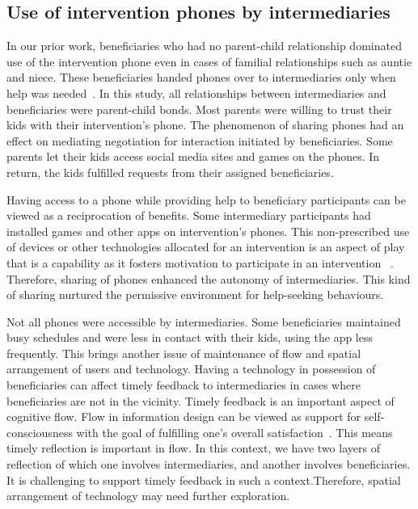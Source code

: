 \documentclass{sig-alternate}
\begin{document}
\subsection*{\textbf{Use of intervention phones by intermediaries}}
In our prior work, beneficiaries who had no parent-child relationship dominated use of the intervention phone even in cases of familial relationships such as auntie and niece. These beneficiaries handed phones over to intermediaries only when help was needed~\cite{katule2016:leveraging}. In this study, all relationships between intermediaries and beneficiaries were parent-child bonds. Most parents were willing to trust their kids with their intervention's phone. The phenomenon of sharing phones had an effect on mediating negotiation for interaction initiated by beneficiaries. Some parents let their kids access social media sites and games on the phones. In return, the kids fulfilled requests from their assigned beneficiaries.

Having access to a phone while providing help to beneficiary participants can be viewed as a reciprocation of benefits. Some intermediary participants had installed games and other apps on intervention's phones. This non-prescribed use of devices or other technologies allocated for an intervention is an aspect of play that is a capability as it fosters motivation to participate in an intervention ~\cite{ferr2015:play}. Therefore, sharing of phones enhanced the autonomy of intermediaries. This kind of sharing nurtured the permissive environment for help-seeking behaviours.  

Not all phones were accessible by intermediaries. Some beneficiaries maintained busy schedules and were less in contact with their kids, using the app less frequently. This brings another issue of maintenance of flow and spatial arrangement of users and technology. Having a technology in possession of beneficiaries can affect timely feedback to intermediaries in cases where beneficiaries are not in the vicinity. Timely feedback is an important aspect of cognitive flow. Flow in information design can be viewed as support for self-consciousness with the goal of fulfilling one's overall satisfaction~\cite{csikszentmihalyiflow}. This means timely reflection is important in flow. In this context, we have two layers of reflection of which one involves intermediaries, and another involves beneficiaries. It is challenging to support timely feedback in such a context.Therefore, spatial arrangement of technology may need further exploration.
\end{document}
